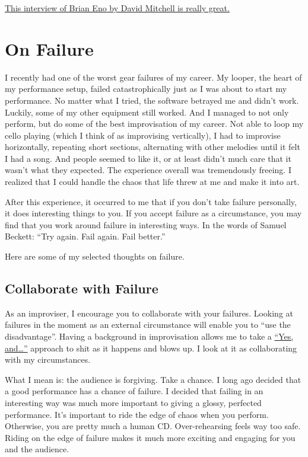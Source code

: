 \documentclass[
]{book}
\begin{document}
\href{http://www.salon.com/2011/10/01/david_mitchell_brian_eno/}{This interview of Brian Eno by David Mitchell is really great.}

\hypertarget{on-failure}{%
\chapter{On Failure}\label{on-failure}}

I recently had one of the worst gear failures of my career. My looper, the heart of my performance setup, failed catastrophically just as I was about to start my performance. No matter what I tried, the software betrayed me and didn't work. Luckily, some of my other equipment still worked. And I managed to not only perform, but do some of the best improvisation of my career. Not able to loop my cello playing (which I think of as improvising vertically), I had to improvise horizontally, repeating short sections, alternating with other melodies until it felt I had a song. And people seemed to like it, or at least didn't much care that it wasn't what they expected. The experience overall was tremendously freeing. I realized that I could handle the chaos that life threw at me and make it into art.

After this experience, it occurred to me that if you don't take failure personally, it does interesting things to you. If you accept failure as a circumstance, you may find that you work around failure in interesting ways. In the words of Samuel Beckett: ``Try again. Fail again. Fail better.''

Here are some of my selected thoughts on failure.

\hypertarget{collaborate-with-failure}{%
\section{Collaborate with Failure}\label{collaborate-with-failure}}

As an improviser, I encourage you to collaborate with your failures. Looking at failures in the moment as an external circumstance will enable you to ``use the disadvantage''. Having a background in improvisation allows me to take a \href{https://en.m.wikipedia.org/wiki/\%22Yes,_And\%22_rule}{``Yes, and\ldots{}''} approach to shit as it happens and blows up. I look at it as collaborating with my circumstances.

What I mean is: the audience is forgiving. Take a chance. I long ago decided that a good performance has a chance of failure. I decided that failing in an interesting way was much more important to giving a glossy, perfected performance. It's important to ride the edge of chaos when you perform. Otherwise, you are pretty much a human CD. Over-rehearsing feels way too safe. Riding on the edge of failure makes it much more exciting and engaging for you and the audience.
\end{document}
